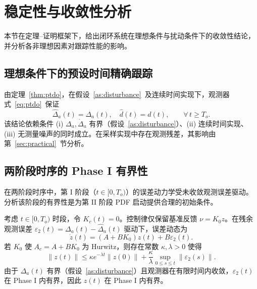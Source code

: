 \section{稳定性与收敛性分析}
\label{sec:stability}

本节在定理--证明框架下，给出闭环系统在理想条件与扰动条件下的收敛性结论，并分析各非理想因素对跟踪性能的影响。

\subsection{理想条件下的预设时间精确跟踪}

由定理~\ref{thm:ptdo}，在假设~\ref{as:disturbance}~及连续时间实现下，观测器式~\eqref{eq:ptdo}~保证
\begin{equation}
\hat\Delta_a(t)=\Delta_a(t),\quad \hat d(t)=d(t),\qquad \forall\,t\ge T_o.
\label{eq:obs_ideal_result}
\end{equation}
该结论依赖条件 (i) \(\Delta_a,\dot\Delta_a\) 有界（假设~\ref{as:disturbance}）、(ii) 连续时间实现、(iii) 无测量噪声的同时成立。在采样实现中存在观测残差，其影响由第~\ref{sec:practical}~节分析。

\subsection{两阶段时序的 Phase I 有界性}

在两阶段时序中，第 I 阶段（\(t\in[0,T_o)\)）的误差动力学受未收敛观测误差驱动。分析该阶段的有界性是为第 II 阶段 PDF 启动提供合理的初始条件。

\begin{proposition}\label{prop:phaseI_ISS}
  考虑 \(t\in[0,T_o)\) 时段，令 \(K_c(t)=0\)。控制律仅保留基准反馈 \(\nu = K_0 z\)。在残余观测误差 \(\varepsilon_2(t)=\Delta_a(t)-\hat\Delta_a(t)\) 驱动下，误差动态为
  \begin{equation}
  \dot z(t) = (A+BK_0)z(t) + B\varepsilon_2(t).
  \label{eq:phaseI_error}
  \end{equation}
  若 \(K_0\) 使 \(A_c = A+BK_0\) 为 Hurwitz，则存在常数 \(\kappa,\lambda>0\) 使得
  \begin{equation}
  \|z(t)\| \le \kappa e^{-\lambda t}\|z(0)\| + \frac{\kappa}{\lambda}\sup_{0\le s\le t}\|\varepsilon_2(s)\|.
  \label{eq:phaseI_ISS}
  \end{equation}
  由于 \(\Delta_a(t)\) 有界（假设~\ref{as:disturbance}）且观测器在有限时间内收敛，\(\varepsilon_2(t)\) 在 Phase I 内有界，因此 \(z(t)\) 在 Phase I 内有界。
\end{proposition}

